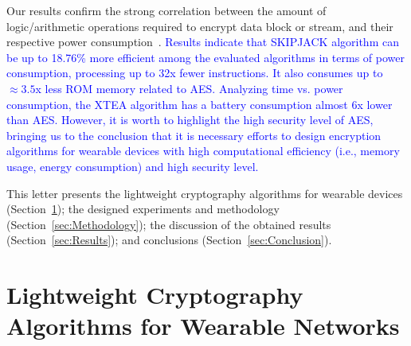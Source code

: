 \documentclass[journal]{IEEEtran}
\newcommand{\rever}{\textcolor{blue}}
\newcommand{\refazer}[1]{{\color{red}{[#1]}}}
\newcommand{\gn}[1]{{\color{red}{[#1]}}}
\begin{document}
Our results confirm the strong correlation between the amount of logic/arithmetic operations required to encrypt data block or stream, and their respective power consumption~\cite{mohd2018lightweight}. \rever{Results indicate that SKIPJACK algorithm can be up to 18.76\% more efficient among the evaluated algorithms in terms of power consumption, processing up to 32x fewer instructions. It also consumes up to $\approx 3.5$x less ROM memory related to AES. %
Analyzing time vs. power consumption, the XTEA algorithm has a battery consumption almost 6x lower than AES. %
However, it is worth to highlight the high security level of AES, bringing us to the conclusion that it is necessary efforts to design encryption algorithms for wearable devices with high computational efficiency (i.e., memory usage, energy consumption) and high security level.}


This letter presents the lightweight cryptography algorithms for wearable devices (Section~\ref{sec:Background}); the designed experiments and methodology (Section~\ref{sec:Methodology}); the discussion of the obtained results (Section~\ref{sec:Results}); and conclusions (Section~\ref{sec:Conclusion}).

\vspace{-0.25cm}
\section{Lightweight Cryptography Algorithms for Wearable Networks}
\label{sec:Background}
%

\end{document}
